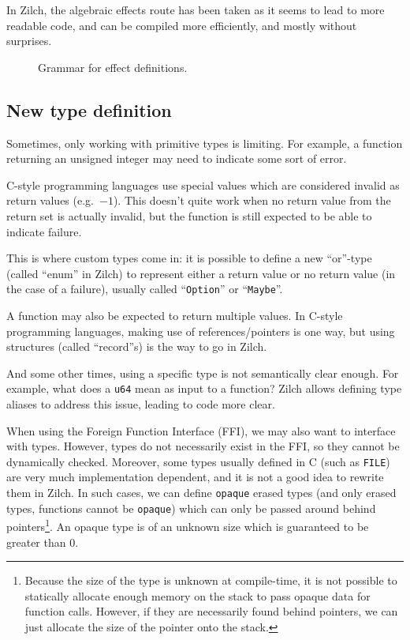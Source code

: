 In Zilch, the algebraic effects route has been taken as it seems to lead to more readable code, and can be compiled more efficiently, and mostly without surprises.

\begin{figure}[H]
	\centering


	\caption{Grammar for effect definitions.}
	\label{fig:zilch-grammar-declarations-effects-grammar}
\end{figure}

\subsection{New type definition}\label{subsec:zilch-grammar-declarations-type}

Sometimes, only working with primitive types is limiting.
For example, a function returning an unsigned integer may need to indicate some sort of error.

\noindent C-style programming languages use special values which are considered invalid as return values (e.g.\ $-1$).
This doesn't quite work when no return value from the return set is actually invalid, but the function is still expected to be able to indicate failure.

\noindent This is where custom types come in: it is possible to define a new ``or''-type (called ``enum'' in Zilch) to represent either a return value or no return value (in the case of a failure), usually called ``\texttt{Option}'' or ``\texttt{Maybe}''.

A function may also be expected to return multiple values.
In C-style programming languages, making use of references/pointers is one way, but using structures (called ``record''s) is the way to go in Zilch.

And some other times, using a specific type is not semantically clear enough.
For example, what does a \texttt{u64} mean as input to a function?
Zilch allows defining type aliases to address this issue, leading to code more clear.

When using the Foreign Function Interface (FFI), we may also want to interface with types.
However, types do not necessarily exist in the FFI, so they cannot be dynamically checked.
Moreover, some types usually defined in C (such as \texttt{FILE}) are very much implementation dependent, and it is not a good idea to rewrite them in Zilch.
In such cases, we can define \texttt{opaque} erased types (and only erased types, functions cannot be \texttt{opaque}) which can only be passed around behind pointers\footnote{Because the size of the type is unknown at compile-time, it is not possible to statically allocate enough memory on the stack to pass opaque data for function calls. However, if they are necessarily found behind pointers, we can just allocate the size of the pointer onto the stack.}.
An opaque type is of an unknown size which is guaranteed to be greater than 0.


